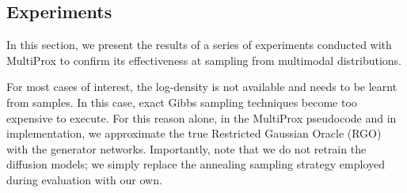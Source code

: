 \subsection{Experiments}

In this section, we present the results of a series of experiments conducted with MultiProx to confirm its effectiveness at sampling from multimodal distributions.

For most cases of interest, the log-density is not available and needs to be learnt from samples. In this case, exact Gibbs sampling techniques become too expensive to execute. For this reason alone, in the MultiProx pseudocode and in implementation, we approximate the true Restricted Gaussian Oracle (RGO) with the generator networks. Importantly, note that we do not retrain the diffusion models; we simply replace the annealing sampling strategy employed during evaluation with our own.






